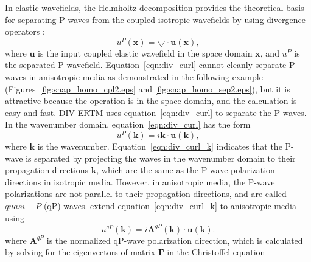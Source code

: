 \documentclass[manuscript,ulem,graphix,revised]{geophysics}
\begin{document}
In elastic wavefields, the Helmholtz decomposition provides the theoretical basis for separating P-waves from the coupled isotropic wavefields by using divergence operators \citep{aki80};
\begin{equation}
u^{P}(\boldsymbol{x})=\bigtriangledown \cdot \boldsymbol{u}(\boldsymbol{x}),
\label{eqn:div_curl}
\end{equation}
where $\boldsymbol{u}$ is the input coupled elastic wavefield in the space domain $\boldsymbol{x}$, and $u^{P}$ is the separated P-wavefield. 
Equation~\ref{eqn:div_curl} cannot cleanly separate P-waves in anisotropic media as demonstrated in the following example (Figures~\ref{fig:snap_homo_cpl2.eps} and \ref{fig:snap_homo_sep2.eps}), but it is attractive because the operation is in the space domain, and the calculation is easy and fast. DIV-ERTM uses equation~\ref{eqn:div_curl} to separate the P-waves. In the wavenumber domain, equation~\ref{eqn:div_curl} has the form
\begin{equation}
u^{P}(\boldsymbol{k})=i \boldsymbol{k} \cdot \boldsymbol{u}(\boldsymbol{k}),
\label{eqn:div_curl_k}
\end{equation}
where $\boldsymbol{k}$ is the wavenumber. Equation~\ref{eqn:div_curl_k} indicates that the P-wave is separated by projecting the waves in the wavenumber domain to their propagation directions $\boldsymbol{k}$, which are the same as the P-wave polarization directions in isotropic media. However, in anisotropic media, the P-wave polarizations are not parallel to their propagation directions, and are called $quasi-P$ (qP) waves. \citet{dellinger90} extend equation~\ref{eqn:div_curl_k} to anisotropic media using
\begin{equation}
u^{qP}(\boldsymbol{k})=i \boldsymbol{A}^{qP}(\boldsymbol{k}) \cdot \boldsymbol{u}(\boldsymbol{k}).
\label{eqn:div_curl_ak}
\end{equation}
where $\boldsymbol{A}^{qP}$ is the normalized qP-wave polarization direction, which is calculated by solving for the eigenvectors of matrix $\boldsymbol{\Gamma}$ in the Christoffel equation
\end{document}
